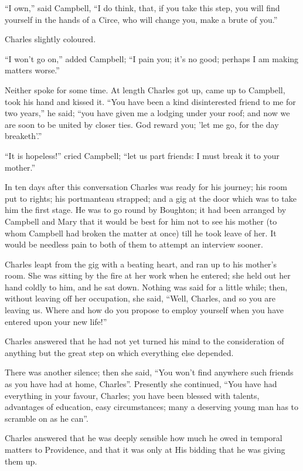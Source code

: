 ``I own,'' said Campbell, ``I do think, that, if you
take this step, you will find yourself in the hands of a Circe, who
will change you, make a brute of you.''

Charles slightly coloured.

``I won't go on,'' added Campbell; ``I pain you; it's
no good; perhaps I am making matters worse.''

Neither spoke for some time. At length Charles got up, came up to
Campbell, took his hand and kissed it. ``You have been a kind
disinterested friend to me for two years,'' he said; ``you
have given me a lodging under your roof; and now we are soon to be
united by closer ties. God reward you; 'let me go, for the day
breaketh'.''

``It is hopeless!'' cried Campbell; ``let us part
friends: I must break it to your mother.''

In ten days after this conversation Charles was ready for his
journey; his room put to rights; his portmanteau strapped; and a gig
at the door which was to take him the first stage. He was to go round
by Boughton; it had been arranged by Campbell and Mary that it would
be best for him not to see his mother (to whom Campbell had broken the
matter at once) till he took leave of her. It would be needless pain
to both of them to attempt an interview sooner.

Charles leapt from the gig with a beating heart, and ran up to his
mother's room. She was sitting by the fire at her work when he
entered; she held out her hand coldly to him, and he sat down. Nothing
was said for a little while; then, without leaving off her occupation, she said, ``Well, Charles, and so you are leaving us.
Where and how do you propose to employ yourself when you have entered
upon your new life!''

Charles answered that he had not yet turned his mind to the
consideration of anything but the great step on which everything else
depended.

There was another silence; then she said, ``You won't find
anywhere such friends as you have had at home, Charles''.
Presently she continued, ``You have had everything in your favour,
Charles; you have been blessed with talents, advantages of education,
easy circumstances; many a deserving young man has to scramble on as
he can''.

Charles answered that he was deeply sensible how much he owed in
temporal matters to Providence, and that it was only at His bidding
that he was giving them up.

